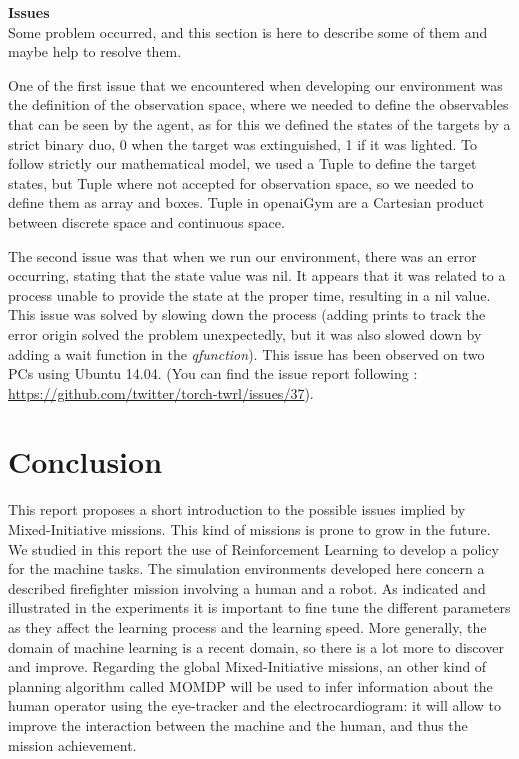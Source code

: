 \documentclass[conference]{IEEEtran}
\begin{document}
\textbf{Issues}\\

Some problem occurred, and this section is here to describe some of them and maybe help to resolve them.

One of the first issue that we encountered when developing our environment was the definition of the observation space, where we needed to define the observables that can be seen by the agent, as for this we defined the states of the targets by a strict binary duo, 0 when the target was extinguished, 1 if it was lighted. To follow strictly our mathematical model, we used a Tuple to define the target states, but Tuple where not accepted for observation space, so we needed to define them as array and boxes.
Tuple in openaiGym are a Cartesian product between discrete space and continuous space.

The second issue was that when we run our environment, there was an error occurring, stating that the state value was nil. It appears that it was related to a process unable to provide the state at the proper time, resulting in a nil value. This issue was solved by slowing down the process (adding prints to track the error origin solved the problem unexpectedly, but it was also slowed down by adding a wait function in the \textit{qfunction}). This issue has been observed on two PCs using Ubuntu 14.04. (You can find the issue report following : \url{https://github.com/twitter/torch-twrl/issues/37}).

\section{Conclusion}

This report proposes a short introduction to the possible issues implied by Mixed-Initiative missions.
This kind of missions is prone to grow in the future. 
We studied in this report the use of Reinforcement Learning to develop a policy for the machine tasks.
The simulation environments developed here concern a described firefighter mission involving a human and a robot.
As indicated and illustrated in the experiments it is important to fine tune the different parameters 
as they affect the learning process and the learning speed.
More generally, the domain of machine learning
is a recent domain, so there is a lot more to discover and improve.
Regarding the global Mixed-Initiative missions, 
an other kind of planning algorithm called MOMDP will be used
to infer information about the human operator using the eye-tracker and the electrocardiogram: 
it will allow to improve the interaction between the machine and the human,
and thus the mission achievement.
\end{document}
